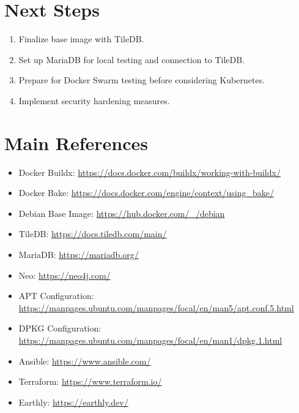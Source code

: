 \documentclass{article}
\begin{document}
\section{Next Steps}
\begin{enumerate}
    \item Finalize base image with TileDB.
    \item Set up MariaDB for local testing and connection to TileDB.
    \item Prepare for Docker Swarm testing before considering Kubernetes.
    \item Implement security hardening measures.
\end{enumerate}

\section{Main References}
\begin{itemize}
    \item Docker Buildx: \href{https://docs.docker.com/buildx/working-with-buildx/}{https://docs.docker.com/buildx/working-with-buildx/}
    \item Docker Bake: \href{https://docs.docker.com/engine/context/using_bake/}{https://docs.docker.com/engine/context/using\_bake/}
    \item Debian Base Image: \href{https://hub.docker.com/_/debian}{https://hub.docker.com/\_/debian}
    \item TileDB: \href{https://docs.tiledb.com/main/}{https://docs.tiledb.com/main/}
    \item MariaDB: \href{https://mariadb.org/}{https://mariadb.org/}
    \item Neo: \href{https://neo4j.com/}{https://neo4j.com/}
    \item APT Configuration: \href{https://manpages.ubuntu.com/manpages/focal/en/man5/apt.conf.5.html}{https://manpages.ubuntu.com/manpages/focal/en/man5/apt.conf.5.html}
    \item DPKG Configuration: \href{https://manpages.ubuntu.com/manpages/focal/en/man1/dpkg.1.html}{https://manpages.ubuntu.com/manpages/focal/en/man1/dpkg.1.html}
    \item Ansible: \href{https://www.ansible.com/}{https://www.ansible.com/}
    \item Terraform: \href{https://www.terraform.io/}{https://www.terraform.io/}
    \item Earthly: \href{https://earthly.dev/}{https://earthly.dev/}
\end{itemize}
\end{document}
